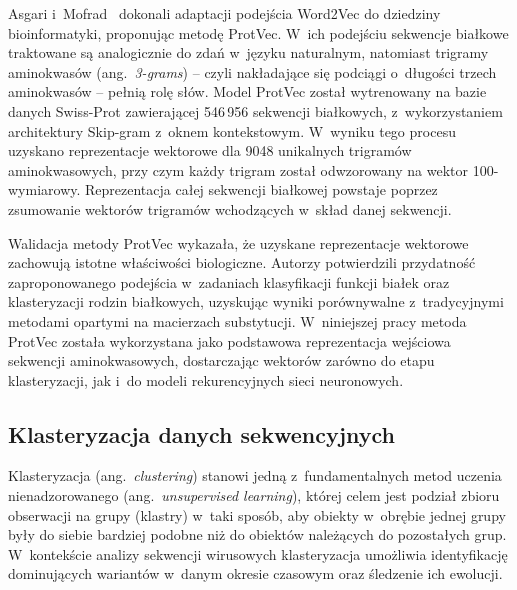 Asgari i~Mofrad~\cite{asgari2015protvec} dokonali adaptacji podejścia Word2Vec do dziedziny bioinformatyki, proponując metodę ProtVec. W~ich podejściu sekwencje białkowe traktowane są analogicznie do zdań w~języku naturalnym, natomiast trigramy aminokwasów (ang.~\textit{3-grams}) -- czyli nakładające się podciągi o~długości trzech aminokwasów -- pełnią rolę słów. Model ProtVec został wytrenowany na bazie danych Swiss-Prot zawierającej 546\,956 sekwencji białkowych, z~wykorzystaniem architektury Skip-gram z~oknem kontekstowym. W~wyniku tego procesu uzyskano reprezentacje wektorowe dla 9048 unikalnych trigramów aminokwasowych, przy czym każdy trigram został odwzorowany na wektor 100-wymiarowy. Reprezentacja całej sekwencji białkowej powstaje poprzez zsumowanie wektorów trigramów wchodzących w~skład danej sekwencji.

Walidacja metody ProtVec wykazała, że uzyskane reprezentacje wektorowe zachowują istotne właściwości biologiczne. Autorzy potwierdzili przydatność zaproponowanego podejścia w~zadaniach klasyfikacji funkcji białek oraz klasteryzacji rodzin białkowych, uzyskując wyniki porównywalne z~tradycyjnymi metodami opartymi na macierzach substytucji. W~niniejszej pracy metoda ProtVec została wykorzystana jako podstawowa reprezentacja wejściowa sekwencji aminokwasowych, dostarczając wektorów zarówno do etapu klasteryzacji, jak i~do modeli rekurencyjnych sieci neuronowych.

\subsection{Klasteryzacja danych sekwencyjnych}
\label{sec:klasteryzacja}

Klasteryzacja (ang.~\textit{clustering}) stanowi jedną z~fundamentalnych metod uczenia nienadzorowanego (ang.~\textit{unsupervised learning}), której celem jest podział zbioru obserwacji na grupy (klastry) w~taki sposób, aby obiekty w~obrębie jednej grupy były do siebie bardziej podobne niż do obiektów należących do pozostałych grup. W~kontekście analizy sekwencji wirusowych klasteryzacja umożliwia identyfikację dominujących wariantów w~danym okresie czasowym oraz śledzenie ich ewolucji.

